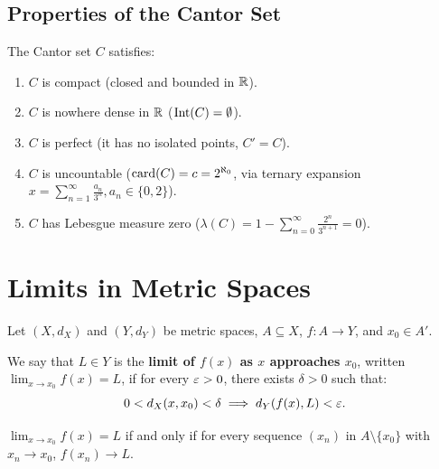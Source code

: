 \section{Properties of the Cantor Set}
\begin{theorem}
The Cantor set $C$ satisfies:
\begin{enumerate}[label=\rm{(\roman*)}]
    \item $C$ is compact (closed and bounded in $\mathbb{R}$).
    \item $C$ is nowhere dense in $\mathbb{R}$ ($\operatorname{Int}(C) = \emptyset$).
    \item $C$ is perfect (it has no isolated points, $C' = C$).
    \item $C$ is uncountable ($\operatorname{card}(C) = c = 2^{\aleph_0}$, via ternary expansion $x = \sum_{n=1}^\infty \frac{a_n}{3^n}, a_n \in \{0,2\}$).
    \item $C$ has Lebesgue measure zero ($\lambda(C) = 1 - \sum_{n=0}^\infty \frac{2^n}{3^{n+1}} = 0$).
\end{enumerate}
\end{theorem}


\chapter{Limits in Metric Spaces}
\label{appendix:limits}

Let $(X, d_X)$ and $(Y, d_Y)$ be metric spaces, $A \subseteq X$, $f: A \to Y$, and $x_0 \in A'$.

\begin{definition}
We say that $L \in Y$ is the \textbf{limit of $f(x)$ as $x$ approaches $x_0$}, written $\lim_{x \to x_0} f(x) = L$, if for every $\varepsilon > 0$, there exists $\delta > 0$ such that:
\[
0 < d_X(x, x_0) < \delta \implies d_Y(f(x), L) < \varepsilon.
\]
\end{definition}

\begin{theorem}
$\lim_{x \to x_0} f(x) = L$ if and only if for every sequence $(x_n)$ in $A \setminus \{x_0\}$ with $x_n \to x_0$, $f(x_n) \to L$.
\end{theorem}
